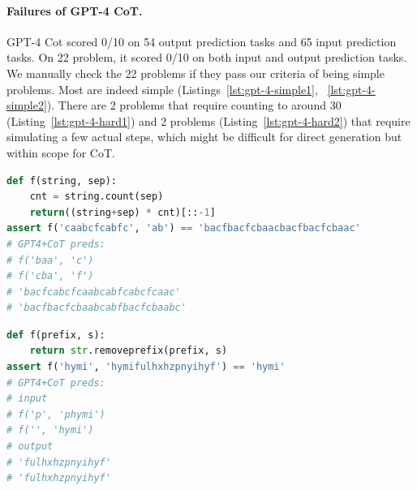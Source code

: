 \paragraph{Failures of GPT-4 CoT.}
GPT-4 Cot scored 0/10 on 54 output prediction tasks and 65 input prediction tasks. On 22 problem, it scored 0/10 on both input and output prediction tasks. 
We manually check the 22 problems if they pass our criteria of being simple problems. Most are indeed simple (Listings~\ref{lst:gpt-4-simple1}, ~\ref{lst:gpt-4-simple2}). There are 2 problems that require counting to around 30 (Listing~\ref{lst:gpt-4-hard1}) and 2 problems (Listing~\ref{lst:gpt-4-hard2}) that require simulating a few actual steps, which might be difficult for direct generation but within scope for CoT. 


\begin{minipage}{.48\textwidth} %
\begin{lstlisting}[caption=GPT-4 has the right idea but cannot do the string concatenation correctly,label={lst:gpt-4-simple1}, breaklines=true, language=python]
def f(string, sep):
    cnt = string.count(sep)
    return((string+sep) * cnt)[::-1]
assert f('caabcfcabfc', 'ab') == 'bacfbacfcbaacbacfbacfcbaac'
# GPT4+CoT preds:
# f('baa', 'c')
# f('cba', 'f')
# 'bacfcabcfcaabcabfcabcfcaac'
# 'bacfbacfcbaabcabfbacfcbaabc'
\end{lstlisting}
\end{minipage}\hfill
\begin{minipage}{.48\textwidth} %
\begin{lstlisting}[caption=GPT-4 might have been misled by the variable name prefix,label={lst:gpt-4-simple2}, breaklines=true, language=python]
def f(prefix, s):
    return str.removeprefix(prefix, s)
assert f('hymi', 'hymifulhxhzpnyihyf') == 'hymi'
# GPT4+CoT preds:
# input
# f('p', 'phymi')
# f('', 'hymi')
# output
# 'fulhxhzpnyihyf'
# 'fulhxhzpnyihyf'
\end{lstlisting}
\end{minipage}


